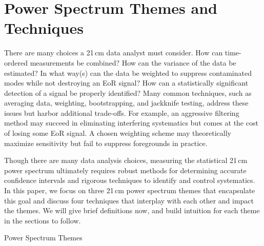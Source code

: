 \documentclass[preprint2,numberedappendix,tighten]{aastex6}
\begin{document}

\section{Power Spectrum Themes and Techniques}
\label{sec:Themes}

There are many choices a 21\,cm data analyst must consider. %
How can time-ordered measurements be combined? How can the 
variance of the data be estimated? In what way(s) can the data be weighted to suppress contaminated modes while not 
destroying an EoR signal? How can a statistically significant detection of a signal be properly identified? Many common techniques, such as 
averaging data, weighting, bootstrapping, and jackknife testing, address these issues but harbor additional trade-offs. For 
example, an aggressive filtering method may succeed in eliminating interfering systematics but comes at the cost of losing 
some EoR signal. A chosen weighting scheme may theoretically maximize sensitivity but fail to suppress foregrounds in practice. 

Though there are many data analysis choices, measuring the statistical 21\,cm power spectrum ultimately requires robust 
methods for determining accurate confidence intervals and rigorous techniques to identify and control systematics.  In this 
paper, we focus on three 21\,cm power spectrum themes that encapsulate this goal and discuss four techniques that interplay 
with each other and impact the themes. We will give brief definitions now, and build intuition for each theme in the sections to 
follow.

\begin{center}
Power Spectrum Themes
\end{center}
\end{document}
